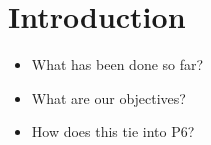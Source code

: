 \chapter{Introduction}
\label{ch:introduction}

\begin{itemize}\tightlist
    \item
        What has been done so far?
    \item
        What are our objectives?
    \item
        How does this tie into P6?
\end{itemize}
